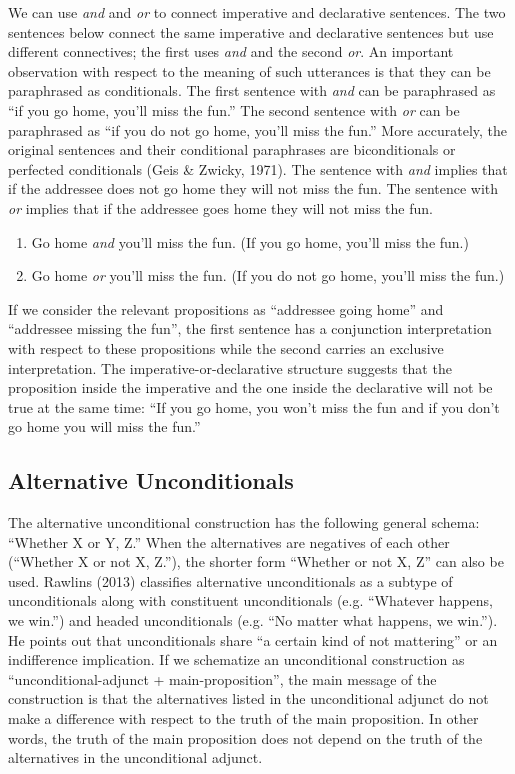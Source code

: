 \documentclass[oneside]{report}
\theoremstyle{definition}
\theoremstyle{definition}
\theoremstyle{definition}
\theoremstyle{remark}
\begin{document}
We can use \emph{and} and \emph{or} to connect imperative and
declarative sentences. The two sentences below connect the same
imperative and declarative sentences but use different connectives; the
first uses \emph{and} and the second \emph{or}. An important observation
with respect to the meaning of such utterances is that they can be
paraphrased as conditionals. The first sentence with \emph{and} can be
paraphrased as ``if you go home, you'll miss the fun.'' The second
sentence with \emph{or} can be paraphrased as ``if you do not go home,
you'll miss the fun.'' More accurately, the original sentences and their
conditional paraphrases are biconditionals or perfected conditionals
(Geis \& Zwicky, 1971). The sentence with \emph{and} implies that if the
addressee does not go home they will not miss the fun. The sentence with
\emph{or} implies that if the addressee goes home they will not miss the
fun.
\begin{enumerate}
\def\labelenumi{(\arabic{enumi})}
\setcounter{enumi}{15}
\tightlist
\item
  Go home \emph{and} you'll miss the fun. (If you go home, you'll miss
  the fun.)
\item
  Go home \emph{or} you'll miss the fun. (If you do not go home, you'll
  miss the fun.)
\end{enumerate}
If we consider the relevant propositions as ``addressee going home'' and
``addressee missing the fun'', the first sentence has a conjunction
interpretation with respect to these propositions while the second
carries an exclusive interpretation. The imperative-or-declarative
structure suggests that the proposition inside the imperative and the
one inside the declarative will not be true at the same time: ``If you
go home, you won't miss the fun and if you don't go home you will miss
the fun.''

\subsection{Alternative
Unconditionals}\label{alternative-unconditionals}

The alternative unconditional construction has the following general
schema: ``Whether X or Y, Z.'' When the alternatives are negatives of
each other (``Whether X or not X, Z.''), the shorter form ``Whether or
not X, Z'' can also be used. Rawlins (2013) classifies alternative
unconditionals as a subtype of unconditionals along with constituent
unconditionals (e.g. ``Whatever happens, we win.'') and headed
unconditionals (e.g. ``No matter what happens, we win.''). He points out
that unconditionals share ``a certain kind of not mattering'' or an
indifference implication. If we schematize an unconditional construction
as ``unconditional-adjunct + main-proposition'', the main message of the
construction is that the alternatives listed in the unconditional
adjunct do not make a difference with respect to the truth of the main
proposition. In other words, the truth of the main proposition does not
depend on the truth of the alternatives in the unconditional adjunct.
\end{document}
